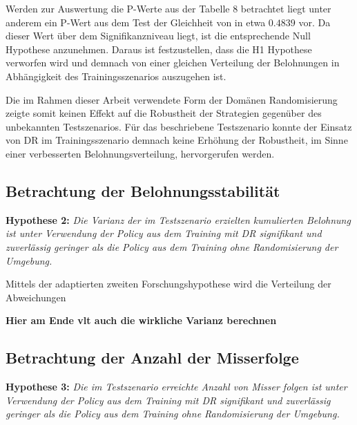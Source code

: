 Werden zur Auswertung die P-Werte aus der Tabelle 8 betrachtet liegt unter anderem ein P-Wert aus dem Test der Gleichheit von in etwa $0.4839$ vor.
Da dieser Wert über dem Signifikanzniveau liegt, ist die entsprechende Null Hypothese anzunehmen.
Daraus ist festzustellen, dass die H1 Hypothese verworfen wird und demnach von einer gleichen Verteilung der Belohnungen in Abhängigkeit des Trainingsszenarios auszugehen ist.

Die im Rahmen dieser Arbeit verwendete Form der Domänen Randomisierung zeigte somit keinen Effekt auf die Robustheit der Strategien gegenüber des unbekannten Testszenarios.
Für das beschriebene Testszenario konnte der Einsatz von DR im Trainingsszenario demnach keine Erhöhung der Robustheit, im Sinne einer verbesserten Belohnungsverteilung, hervorgerufen werden.

\subsection{Betrachtung der Belohnungsstabilität}

\textbf{Hypothese 2:}
\textit{Die Varianz der im Testszenario erzielten kumulierten Belohnung ist unter Verwendung der Policy aus dem Training mit DR signifikant und zuverlässig geringer als die Policy aus dem Training ohne Randomisierung der Umgebung.}

Mittels der adaptierten zweiten Forschungshypothese wird die Verteilung der Abweichungen 


\textbf{Hier am Ende vlt auch die wirkliche Varianz berechnen}

\subsection{Betrachtung der Anzahl der Misserfolge}

\textbf{Hypothese 3:}
\textit{Die im Testszenario erreichte Anzahl von Misser folgen ist unter Verwendung der Policy aus dem Training mit DR signifikant und zuverlässig geringer als die Policy aus dem Training ohne Randomisierung der Umgebung.}


